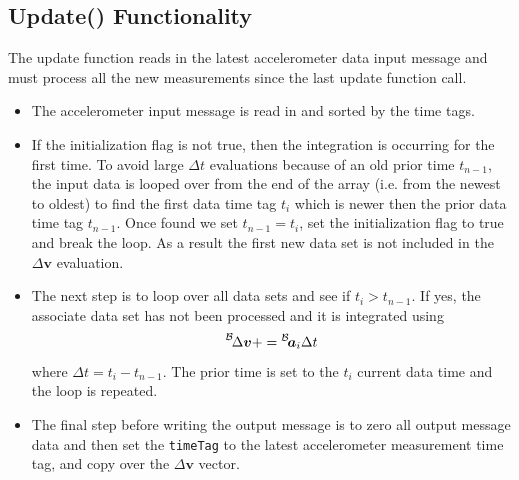 \subsection{Update() Functionality}
The update function reads in the latest accelerometer data input message and must process all the new measurements since the last update function call.  
\begin{itemize}
	\item The accelerometer input message is read in and sorted by the time tags.
	\item If the initialization flag is not true, then the integration is occurring for the first time.  To avoid large $\Delta t$ evaluations because of an old prior time $t_{n-1}$, the input data is looped over from the end of the array (i.e. from the newest to oldest) to find the first data time tag $t_{i}$ which is newer then the prior data time tag $t_{n-1}$.  Once found we set $t_{n-1} = t_{i}$, set the initialization flag to true and break the loop.  As a result the first new data set is not included in the $\Delta\bm v$ evaluation.
	\item The next step is to loop over all data sets and see if $t_{i}>t_{n-1}$.  If yes, the associate data set has not been processed and it is integrated using $$\leftexp{B}{\Delta\bm v} += \leftexp{B}{\bm a_{i}} \Delta t$$ where $\Delta t = t_{i} - t_{n-1}$.  The prior time is set to the $t_{i}$ current data time and the loop is repeated.
	\item The final step before writing the output message is to zero all output message data and then set the {\tt timeTag} to the latest accelerometer measurement time tag, and copy over the $\Delta\bm v$ vector.
\end{itemize}